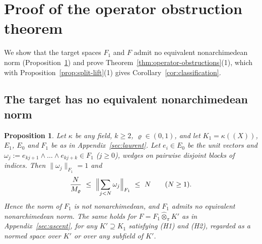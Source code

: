 \documentclass[11pt]{amsart}
\newtheorem{proposition}[theorem]{Proposition}
\theoremstyle{definition}
\theoremstyle{remark}
\numberwithin{equation}{section}
\newcommand{\norm}[1]{\lVert #1\rVert}
\theoremstyle{plain}
\theoremstyle{definition}
\theoremstyle{plain}
\begin{document}

\section{Proof of the operator obstruction theorem}\label{app:assembly}\label{sec:proofs}

We show that the target spaces $F_1$ and $F$ admit no equivalent nonarchimedean norm (Proposition~\ref{prop:nonultra}) and prove Theorem~\ref{thm:operator-obstructions}(1), which with Proposition~\ref{prop:split-lift}(1) gives Corollary~\ref{cor:classification}.

\subsection{The target has no equivalent nonarchimedean norm}

\begin{proposition}\label{prop:nonultra}
Let $\kappa$ be any field, $k\ge2$, $\varrho\in(0,1)$, and let $K_1=\kappa((X))$, $E_1$, $E_0$ and $F_1$ be as in
Appendix~\ref{sec:laurent}. Let $e_i\in E_0$ be the unit vectors and $\omega_j:=e_{kj+1}\wedge\dots\wedge e_{kj+k}\in F_1$
($j\ge0$), wedges on pairwise disjoint blocks of indices. Then $\norm{\omega_j}_{F_1}=1$ and
\[
\frac N{M_\varrho}\ \le\ \Bigl\lVert\sum_{j<N}\omega_j\Bigr\rVert_{F_1}\ \le\ N\qquad(N\ge1).
\]
Hence the norm of $F_1$ is not nonarchimedean, and $F_1$ admits no equivalent nonarchimedean norm. The same holds for
$F=F_1\widehat\otimes_\pi K'$ as in Appendix~\ref{sec:ascent}, for any $K'\supseteq K_1$ satisfying \textup{(H1)} and \textup{(H2)},
regarded as a normed space over $K'$ or over any subfield of $K'$.
\end{proposition}
\end{document}
